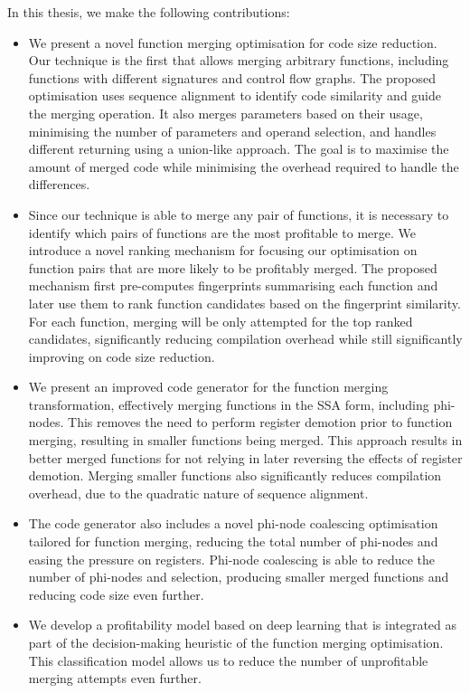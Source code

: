 In this thesis, we make the following contributions:
\begin{itemize}
  \item 
  We present a novel function merging optimisation for code size reduction.
  Our technique is the first that allows merging arbitrary functions, including functions with different signatures and control flow graphs.
  The proposed optimisation uses sequence alignment to identify code similarity and guide the merging operation.
  It also merges parameters based on their usage, minimising the number of parameters and operand selection, and handles different returning using a union-like approach.
  The goal is to maximise the amount of merged code while minimising the overhead required to handle the differences.
  
  \item
  Since our technique is able to merge any pair of functions, it is necessary to identify which pairs of functions are the most profitable to merge.
  We introduce a novel ranking mechanism for focusing our optimisation on function pairs that are more likely to be profitably merged.
  The proposed mechanism first pre-computes fingerprints summarising each function and later use them to rank function candidates based on the fingerprint similarity.
  For each function, merging will be only attempted for the top ranked candidates, significantly reducing compilation overhead while still significantly improving on code size reduction.


  \item
  We present an improved code generator for the function merging transformation, effectively merging functions in the SSA form, including phi-nodes.
  This removes the need to perform register demotion prior to function merging, resulting in smaller functions being merged. 
  This approach results in better merged functions for not relying in later reversing the effects of register demotion.
  Merging smaller functions also significantly reduces compilation overhead, due to the quadratic nature of sequence alignment.

  \item
  The code generator also includes a novel phi-node coalescing optimisation tailored for function merging, reducing the total number of phi-nodes and easing the pressure on registers.
  Phi-node coalescing is able to reduce the number of phi-nodes and selection, producing smaller merged functions and reducing code size even further.

  \item
  We develop a profitability model based on deep learning that is integrated as part of the decision-making heuristic of the function merging optimisation.
  This classification model allows us to reduce the number of unprofitable merging attempts even further.
\end{itemize}


